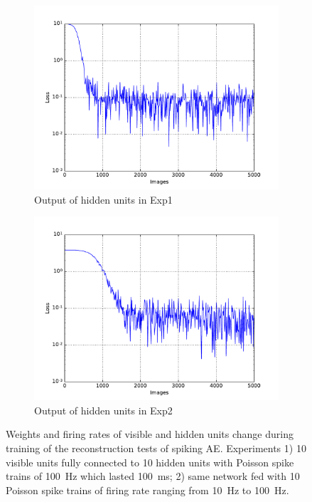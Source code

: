 \begin{figure}
\begin{subfigure}[t]{0.4\textwidth}
		\includegraphics[width=\textwidth]{pics_sdlm/01_exp_SAE_Orig_long/exp1_mse_nons.pdf}
		\caption{Output of hidden units in Exp1}
	\end{subfigure}
	\begin{subfigure}[t]{0.4\textwidth}
		\includegraphics[width=\textwidth]{pics_sdlm/01_exp_SAE_Orig_long/exp2_mse_nons.pdf}
		\caption{Output of hidden units in Exp2}
	\end{subfigure}
	\caption{Weights and firing rates of visible and hidden units change during training of the reconstruction tests of spiking AE. 
		Experiments 1) 10 visible units fully connected to 10 hidden units with Poisson spike trains of 100~Hz which lasted 100~ms; 2) same network fed with 10 Poisson spike trains of firing rate ranging from 10~Hz to 100~Hz.}
\end{figure}

